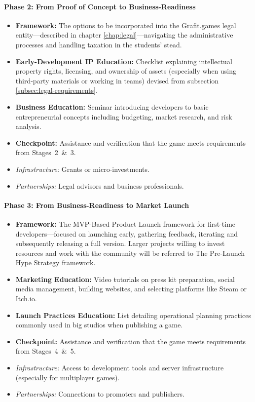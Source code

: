 \paragraph{\large Phase 2: From Proof of Concept to Business-Readiness}
\begin{itemize}
    \item \textbf{Framework:} The options to be incorporated into the Grafit.games legal entity---described in chapter \ref{chap:legal}---navigating the administrative processes and handling taxation in the students’ stead.
    \item \textbf{Early-Development IP Education:} Checklist explaining intellectual property rights, licensing, and ownership of assets (especially when using third-party materials or working in teams) devised from subsection \ref{subsec:legal-requirements}.
    \item \textbf{Business Education:} Seminar introducing developers to basic entrepreneurial concepts including budgeting, market research, and risk analysis.
    \item \textbf{Checkpoint:} Assistance and verification that the game meets requirements from Stages~2~\&~3.
    \item \textit{Infrastructure:} Grants or micro-investments.
    \item \textit{Partnerships:} Legal advisors and business professionals.
\end{itemize}
\paragraph{\large Phase 3: From Business-Readiness to Market Launch}
\begin{itemize}
    \item \textbf{Framework:} The MVP-Based Product Launch framework for first-time developers---focused on launching early, gathering feedback, iterating and subsequently releasing a full version. Larger projects willing to invest resources and work with the community will be referred to The Pre-Launch Hype Strategy framework. \cite{launch-frameworks}
    \item \textbf{Marketing Education:} Video tutorials on press kit preparation, social media management, building websites, and selecting platforms like Steam or Itch.io.
    \item \textbf{Launch Practices Education:} List detailing operational planning practices commonly used in big studios when publishing a game.
    \item \textbf{Checkpoint:} Assistance and verification that the game meets requirements from Stages~4~\&~5.
    \item \textit{Infrastructure:} Access to development tools and server infrastructure (especially for multiplayer games).
    \item \textit{Partnerships:} Connections to promoters and publishers.
\end{itemize}
